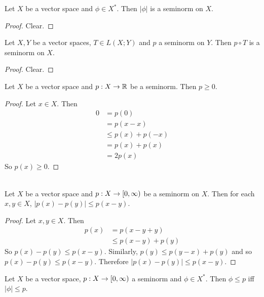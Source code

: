 \documentclass{book}
\begin{document}
	\begin{ex}
		Let $X$ be a vector space and $\phi \in X^*$. Then $|\phi|$ is a seminorm on $X$.
	\end{ex}
	
	\begin{proof}
		Clear.
	\end{proof}

	\begin{ex}
		Let $X,Y$ be a vector spaces, $T \in L(X; Y)$ and $p$ a seminorm on $Y$. Then $p \circ T$ is a seminorm on $X$.
	\end{ex}
	
	\begin{proof}
		Clear.
	\end{proof}
	
	\begin{ex} 
		Let $X$ be a vector space and $p: X \rightarrow \mathbb{R}$ be a seminorm. Then $p \geq 0$. 
	\end{ex}
	
	\begin{proof}
		Let $x \in X$. Then 
		\begin{align*}
			0 
			&= p(0) \\ 
			&= p(x - x) \\
			&\leq  p(x) + p(-x) \\
			&= p(x) + p(x) \\
			&= 2p(x)
		\end{align*}
		So $p(x) \geq 0$.
	\end{proof}

	\begin{ex}  \\
		Let $X$ be a vector space and $p:X \rightarrow [0,\infty)$ be a seminorm on $X$. Then for each $x ,y \in X$, $|p(x) - p(y)| \leq p(x - y)$.  
	\end{ex}
	
	\begin{proof}
		Let $x, y \in X$. Then 
		\begin{align*}
			p(x)
			&= p(x -y + y) \\
			&\leq p(x - y) + p(y) 
		\end{align*}
		So $p(x) - p(y) \leq p(x - y)$. 
		Similarly, $p(y) \leq p(y - x) + p(y)$ and so $p(x) - p(y) \leq p(x - y)$. Therefore $|p(x) - p(y)| \leq p(x - y)$.
	\end{proof}
	
	\begin{ex}
		Let $X$ be a vector space, $p: X \rightarrow [0,\infty)$ a seminorm and $\phi \in X^*$. Then $\phi \leq p$ iff $|\phi| \leq p$. 
	\end{ex}
	
\end{document}

